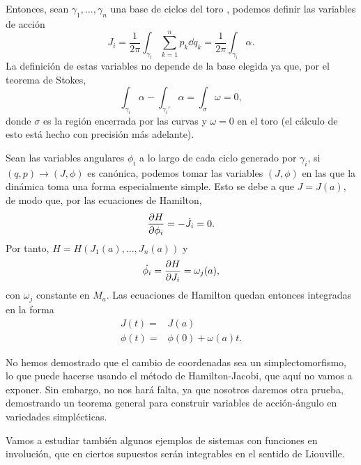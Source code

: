 \begin{ejemplo}
  Entonces, sean $\gamma_1,\dots,\gamma_n$ una base de ciclos del toro , podemos definir las variables de acción 
  \begin{equation*}
    J_i = \frac{1}{2\pi}\int_{\gamma_i} \sum_{k=1}^n p_k \dd q_k = \frac{1}{2\pi} \int_{\gamma_i} \alpha.
  \end{equation*}
  La definición de estas variables no depende de la base elegida ya que, por el teorema de Stokes,
  \begin{equation*}
    \int_{\gamma_i} \alpha - \int_{\gamma_i'} \alpha = \int_{\sigma} \omega=0,
  \end{equation*}
  donde $\sigma$ es la región encerrada por las curvas y $\omega=0$ en el toro (el cálculo de esto está hecho con precisión más adelante).

Sean las variables angulares $\phi_i$ a lo largo de cada ciclo generado por $\gamma_i$, si $(q,p) \rightarrow (J,\phi)$ es canónica, podemos tomar las variables $(J,\phi)$ en las que la dinámica toma una forma especialmente simple. Esto se debe a que $J=J(a)$, de modo que, por las ecuaciones de Hamilton, 
\begin{equation*}
  \frac{\partial H}{\partial \phi_i}=-\dot{J_i}=0.
\end{equation*}
Por tanto, $H=H(J_1(a),\dots,J_n(a))$ y 
\begin{equation*}
  \dot{\phi_i}=\frac{\partial H}{\partial J_i} = \omega_j(a),
\end{equation*}
con $\omega_j$ constante en $M_a$. Las ecuaciones de Hamilton quedan entonces integradas en la forma
\begin{align*}
  J(t)= & J(a) \\
  \phi(t) = & \phi(0) + \omega(a) t.
\end{align*}

No hemos demostrado que el cambio de coordenadas sea un simplectomorfismo, lo que puede hacerse usando el método de Hamilton-Jacobi, que aquí no vamos a exponer. Sin embargo, no nos hará falta, ya que nosotros daremos otra prueba, demostrando un teorema general para construir variables de acción-ángulo en variedades simplécticas.
\end{ejemplo}

Vamos a estudiar también algunos ejemplos de sistemas con funciones en involución, que en ciertos supuestos serán integrables en el sentido de Liouville.
  
